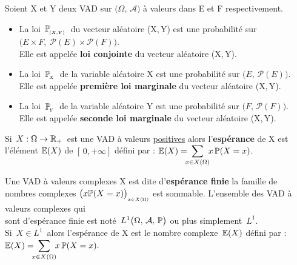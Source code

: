 \noindent Soient X et Y deux VAD sur \(\bigl(\Omega,\,\mathcal{A}\bigr)\) à valeurs dans E et F respectivement.
\begin{itemize}[label=•]\vspace{-0.1cm}
    \item La loi \(\,\mathbb{P}_{\!_{(X,Y)}}\,\) du vecteur aléatoire (X,\,Y) est une probabilité sur \(\bigl(E\!\times\! F,\; \mathcal{P}(E)\!\times \!\mathcal{P}(F)\bigr)\).\\
    Elle est appelée \textbf{loi conjointe} du vecteur aléatoire (X,\,Y).

    \item La loi \(\,\mathbb{P}_{\!_X}\,\) de la variable aléatoire X est une probabilité sur \(\bigl(E,\, \mathcal{P}(E)\bigr)\).\\
    Elle est appelée \textbf{première loi marginale} du vecteur aléatoire (X,\,Y).

    \item La loi \(\,\mathbb{P}_{\!_Y}\,\) de la variable aléatoire Y est une probabilité sur \(\bigl(F,\, \mathcal{P}(F)\bigr)\).\\
    Elle est appelée \textbf{seconde loi marginale} du vecteur aléatoire (X,\,Y).
\end{itemize}

\vspace{1.5cm}

Si \(\,X:\Omega \to \mathbb{R}_+\,\) est une VAD à valeurs \underline{positives} alors l'\textbf{espérance} de X est l'élément \(\mathbb{E}(X)\) de \([\,0,+\infty]\) défini par : \(\displaystyle \mathbb{E}(X)=\!\!\!\sum_{x\in X(\Omega)}\!\!x\,\mathbb{P}(X=x).\) 

\vspace{1.5cm}

Une VAD à valeurs complexes X est dite d'\textbf{espérance finie} \ssi la famille de nombres complexes \(\bigl(x\mathbb{P}(X=x)\bigr)_{_{x\in X(\Omega)}}\) est sommable. L'ensemble des VAD à valeurs complexes qui\vspace{0.1cm}\\
sont d'espérance finie est noté \(\,L^1\bigl(\Omega,\,\mathcal{A},\,\mathbb{P}\bigr)\) ou plus simplement \(\,L^1\).\vspace{0.4cm}\\
Si \(\,X\in L^1\,\) alors l'espérance de X est le nombre complexe \(\,\mathbb{E}(X)\) défini par : \(\displaystyle \mathbb{E}(X)=\!\!\!\sum_{x\in X(\Omega)}\!\!x\,\mathbb{P}(X=x).\)

